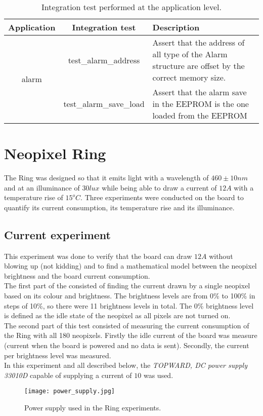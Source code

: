\begin{table}[h!]
	\centering
	\caption{Integration test performed at the application level.}
	\label{table:integrationTest}
	\begin{tabular}{ccp{18em}}
		\hline
		\toprule
		\textbf{Application} & \textbf{Integration test} & \textbf{Description}\\
		\bottomrule
		\toprule
		\multirow{6}{*}{alarm} & test\_alarm\_address & Assert that the address of all type of the Alarm structure are offset by the correct memory size.\\
		& test\_alarm\_save\_load & Assert that the alarm save in the EEPROM is the one loaded from the EEPROM\\ 
		\bottomrule
		\hline
	\end{tabular}
\end{table}

\section{Neopixel Ring}
The Ring was designed so that it emits light with a wavelength of $460\pm 10nm$ and at an illuminance of  $30lux$ while being able to draw a current of $12A$ with a temperature rise of $15^oC$. Three experiments were conducted on the board to quantify its current consumption, its temperature rise and its illuminance.  

\subsection{Current experiment}
This experiment was done to verify that the board can draw $12A$ without blowing up (not kidding) and to find a mathematical model between the neopixel brightness and the board current consumption.\\
The first part of the consisted of finding the current drawn by a single neopixel based on its colour and brightness. The brightness levels are from 0\% to 100\% in steps of 10\%, so there were 11 brightness levels in total. The 0\% brightness level is defined as the idle state of the neopixel as all pixels are not turned on.\\
The second part of this test consisted of measuring the current consumption of the Ring with all 180 neopixels. Firstly the idle current of the board was measure (current when the board is powered and no data is sent). Secondly, the current per brightness level was measured.\\
In this experiment and all described below, the \textit{TOPWARD, DC power supply 33010D} capable of supplying a current of $10$ was used.
\begin{figure}[ht]
	\centering
	\texttt{[image: power\_supply.jpg]}
	\caption{Power supply used in the Ring experiments.}
	\label{fig:power_supply}
\end{figure}
